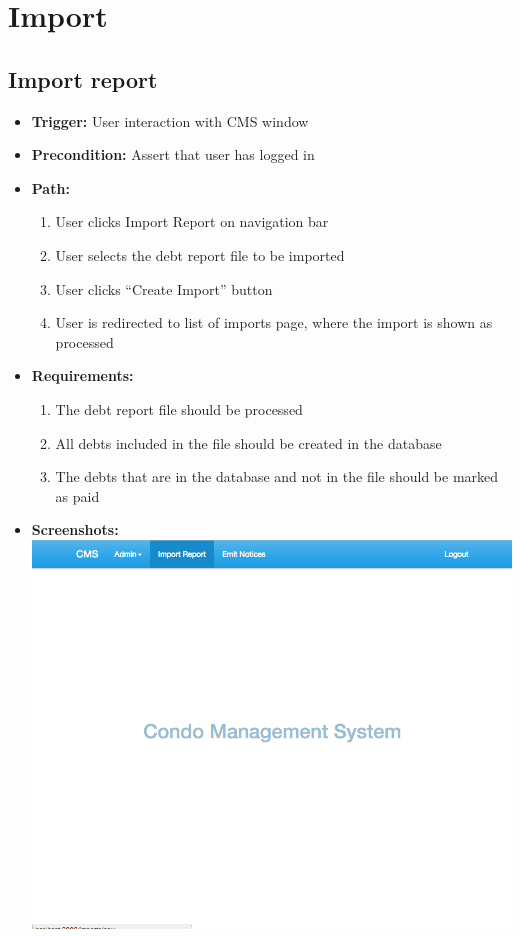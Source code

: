 \section*{Import}

\subsection*{Import report}

\begin{itemize}
  \item[] \textbf{Trigger:} User interaction with CMS window
  \item[] \textbf{Precondition:} Assert that user has logged in
  \item[] \textbf{Path:}
    \begin{enumerate}
      \item User clicks Import Report on navigation bar
      \item User selects the debt report file to be imported
      \item User clicks ``Create Import'' button
      \item User is redirected to list of imports page, where the import is shown as processed
    \end{enumerate}
  \item[] \textbf{Requirements:}
    \begin{enumerate}
      \item The debt report file should be processed
      \item All debts included in the file should be created in the database
      \item The debts that are in the database and not in the file should be marked as paid
    \end{enumerate}
  \item[] \textbf{Screenshots:} \\
    \includegraphics[scale=0.25]{./images/ss/import/1.png}

\end{itemize}
